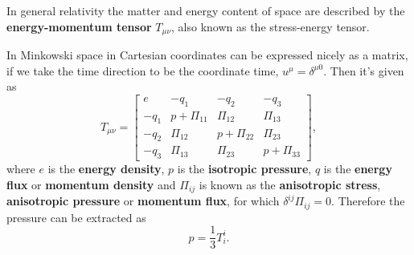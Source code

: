 In general relativity the matter and energy content of space are described by the \textbf{energy-momentum tensor} $T_{\mu \nu}$, also known as the stress-energy tensor.
\iffalse
Without loss of generality it can be decomposed as
\begin{equation}
T_{\mu \nu} = e u_\mu u_\nu + p h_{\mu \nu} + 2 q_{(\mu} u_{\beta)} + \Pi_{\mu \mu},
\end{equation}
where $h_{\mu \nu} = g_{\mu \nu} + u_\alpha u_\beta$ projects orthogonally to the time direction given by $u^\alpha$, $e$ is the \textbf{energy density}, p is the \textbf{pressure}, $q_\alpha$ is the \textbf{energy flux} or \textbf{momentum density}, and $\Pi_{\mu \nu}$ is the \textbf{anisotropic stress} or \textbf{anisotropic pressure}.
\fi
In Minkowski space in Cartesian coordinates can be expressed nicely as a matrix,
if we take the time direction to be the coordinate time, $u^\mu = \delta^{\mu 0}$.
Then it's given as
\cites[eq. 4.17]{rasanen_gr_2022}[fig. 3.3]{rezzolla_relativistic_2013}
\begin{equation}
T_{\mu \nu} =
\begin{bmatrix}
e & -q_1 & -q_2 & -q_3 \\
-q_1 & p + \Pi_{11} & \Pi_{12} & \Pi_{13} \\
-q_2 & \Pi_{12} & p + \Pi_{22} & \Pi_{23} \\
-q_3 & \Pi_{13} & \Pi_{23} & p + \Pi_{33}
\end{bmatrix},
\label{eq:ep_tensor_general_matrix}
\end{equation}
where $e$ is the \textbf{energy density}, $p$ is the \textbf{isotropic pressure}, $q$ is the \textbf{energy flux} or \textbf{momentum density} and
$\Pi_{ij}$ is known as the \textbf{anisotropic stress}, \textbf{anisotropic pressure} or \textbf{momentum flux},
for which $\delta^{ij} \Pi_{ij} = 0$.
Therefore the pressure can be extracted as
\begin{equation}
p = \frac{1}{3} T^i_i.
\label{eq:pressure_from_ep_tensor}
\end{equation}

